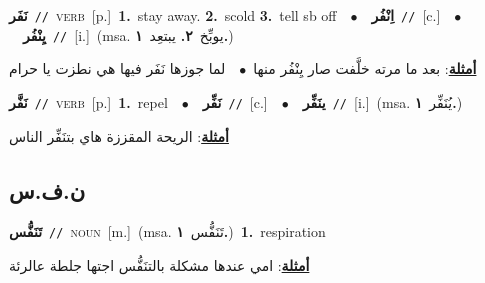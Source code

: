 \documentclass[10pt,a4paper,twoside]{article} %
\begin{document}
\begin{multicols}{2}
{\setlength\topsep{0pt}\textbf{\foreignlanguage{arabic}{نَفَر}}\ {\color{gray}\texttt{//}\color{black}}\ \textsc{verb}\ [p.]\ \textbf{1.}~stay away.  \textbf{2.}~scold  \textbf{3.}~tell sb off\ \ $\bullet$\ \ \setlength\topsep{0pt}\textbf{\foreignlanguage{arabic}{اِنْفُر}}\ {\color{gray}\texttt{//}\color{black}}\ [c.]\ \ $\bullet$\ \ \setlength\topsep{0pt}\textbf{\foreignlanguage{arabic}{يِنْفُر}}\ {\color{gray}\texttt{//}\color{black}}\ [i.]\ \color{gray}(msa. \foreignlanguage{arabic}{يوبِّخ}~\foreignlanguage{arabic}{\textbf{٢.}}  \foreignlanguage{arabic}{يبتعِد}~\foreignlanguage{arabic}{\textbf{١.}})\color{black}\  \begin{flushright}\color{gray}\foreignlanguage{arabic}{\textbf{\underline{\foreignlanguage{arabic}{أمثلة}}}: بعد ما مرته خلَّفت صار يِنْفُر منها\ $\bullet$\ \  لما جوزها نَفَر فيها هي نطزت يا حرام}\end{flushright}\color{black}} \vspace{2mm}

{\setlength\topsep{0pt}\textbf{\foreignlanguage{arabic}{نَفَّر}}\ {\color{gray}\texttt{//}\color{black}}\ \textsc{verb}\ [p.]\ \textbf{1.}~repel\ \ $\bullet$\ \ \setlength\topsep{0pt}\textbf{\foreignlanguage{arabic}{نَفِّر}}\ {\color{gray}\texttt{//}\color{black}}\ [c.]\ \ $\bullet$\ \ \setlength\topsep{0pt}\textbf{\foreignlanguage{arabic}{ينَفِّر}}\ {\color{gray}\texttt{//}\color{black}}\ [i.]\ \color{gray}(msa. \foreignlanguage{arabic}{يُنَفِّر}~\foreignlanguage{arabic}{\textbf{١.}})\color{black}\  \begin{flushright}\color{gray}\foreignlanguage{arabic}{\textbf{\underline{\foreignlanguage{arabic}{أمثلة}}}: الريحة المقززة هاي بتنَفِّر الناس}\end{flushright}\color{black}} \vspace{2mm}

\vspace{-3mm}
\subsection*{\color{blue}\foreignlanguage{arabic}{ن.ف.س}\color{blue}{}} 

{\setlength\topsep{0pt}\textbf{\foreignlanguage{arabic}{تَنَفُّس}}\ {\color{gray}\texttt{//}\color{black}}\ \textsc{noun}\ [m.]\ \color{gray}(msa. \foreignlanguage{arabic}{تَنَفُّس}~\foreignlanguage{arabic}{\textbf{١.}})\color{black}\ \textbf{1.}~respiration\  \begin{flushright}\color{gray}\foreignlanguage{arabic}{\textbf{\underline{\foreignlanguage{arabic}{أمثلة}}}: امي عندها مشكلة بالتنَفُّس اجتها جلطة عالرئة}\end{flushright}\color{black}} \vspace{2mm}


\end{multicols}
\end{document}
